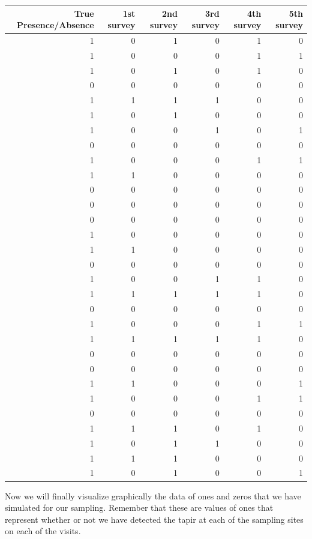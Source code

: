 \documentclass[
]{book}
\begin{document}
\begin{tabular}{r|r|r|r|r|r}
\hline
True Presence/Absence & 1st survey & 2nd survey & 3rd survey & 4th survey & 5th survey\\
\hline
1 & 0 & 1 & 0 & 1 & 0\\
\hline
1 & 0 & 0 & 0 & 1 & 1\\
\hline
1 & 0 & 1 & 0 & 1 & 0\\
\hline
0 & 0 & 0 & 0 & 0 & 0\\
\hline
1 & 1 & 1 & 1 & 0 & 0\\
\hline
1 & 0 & 1 & 0 & 0 & 0\\
\hline
1 & 0 & 0 & 1 & 0 & 1\\
\hline
0 & 0 & 0 & 0 & 0 & 0\\
\hline
1 & 0 & 0 & 0 & 1 & 1\\
\hline
1 & 1 & 0 & 0 & 0 & 0\\
\hline
0 & 0 & 0 & 0 & 0 & 0\\
\hline
0 & 0 & 0 & 0 & 0 & 0\\
\hline
0 & 0 & 0 & 0 & 0 & 0\\
\hline
1 & 0 & 0 & 0 & 0 & 0\\
\hline
1 & 1 & 0 & 0 & 0 & 0\\
\hline
0 & 0 & 0 & 0 & 0 & 0\\
\hline
1 & 0 & 0 & 1 & 1 & 0\\
\hline
1 & 1 & 1 & 1 & 1 & 0\\
\hline
0 & 0 & 0 & 0 & 0 & 0\\
\hline
1 & 0 & 0 & 0 & 1 & 1\\
\hline
1 & 1 & 1 & 1 & 1 & 0\\
\hline
0 & 0 & 0 & 0 & 0 & 0\\
\hline
0 & 0 & 0 & 0 & 0 & 0\\
\hline
1 & 1 & 0 & 0 & 0 & 1\\
\hline
1 & 0 & 0 & 0 & 1 & 1\\
\hline
0 & 0 & 0 & 0 & 0 & 0\\
\hline
1 & 1 & 1 & 0 & 1 & 0\\
\hline
1 & 0 & 1 & 1 & 0 & 0\\
\hline
1 & 1 & 1 & 0 & 0 & 0\\
\hline
1 & 0 & 1 & 0 & 0 & 1\\
\hline
\end{tabular}

Now we will finally visualize graphically the data of ones and zeros that we have simulated for our sampling. Remember that these are values of ones that represent whether or not we have detected the tapir at each of the sampling sites on each of the visits.
\end{document}
